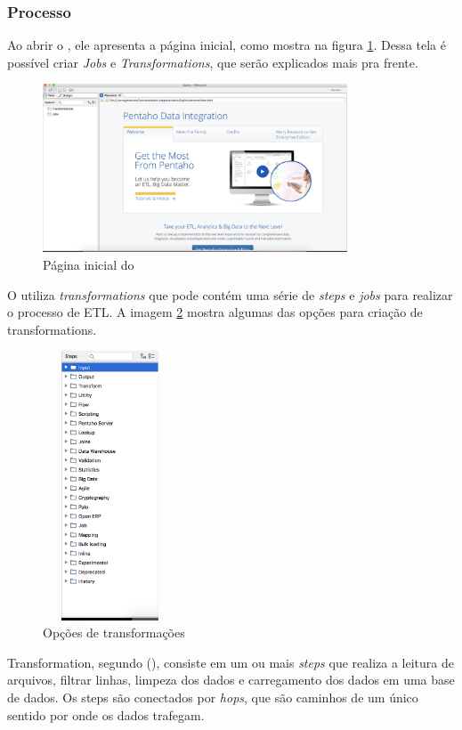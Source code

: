 \subsubsection{Processo}
Ao abrir o \pdi, ele apresenta a página inicial, como mostra na figura \ref{fig:initialpdi}. Dessa tela é possível criar \textit{Jobs} e \textit{Transformations}, que serão explicados mais pra frente. 
\begin{figure}[H]
\centering
\includegraphics[height=5cm]{imagens/pagina_principal_pentaho.png}
\caption{Página inicial do \pdi}
\label{fig:initialpdi}
\end{figure}
O \pdi utiliza \textit{transformations} que pode contém uma série de \textit{steps} e \textit{jobs} para realizar o processo de ETL. A imagem \ref{fig:transformationOptions} mostra algumas das opções para criação de transformations.
\begin{figure}[H]
\centering
\includegraphics[width=4cm, height=8cm]{imagens/opcoes_de_transformacao.png}
\caption{Opções de transformações}
\label{fig:transformationOptions}

\end{figure}
Transformation, segundo \citeauthor{kettle} (\citeyear{kettle}), consiste em um ou mais \textit{steps} que realiza a leitura de arquivos, filtrar linhas, limpeza dos dados e carregamento dos dados em uma base de dados. Os steps são conectados por \textit{hops}, que são caminhos de um único sentido por onde os dados trafegam. 
